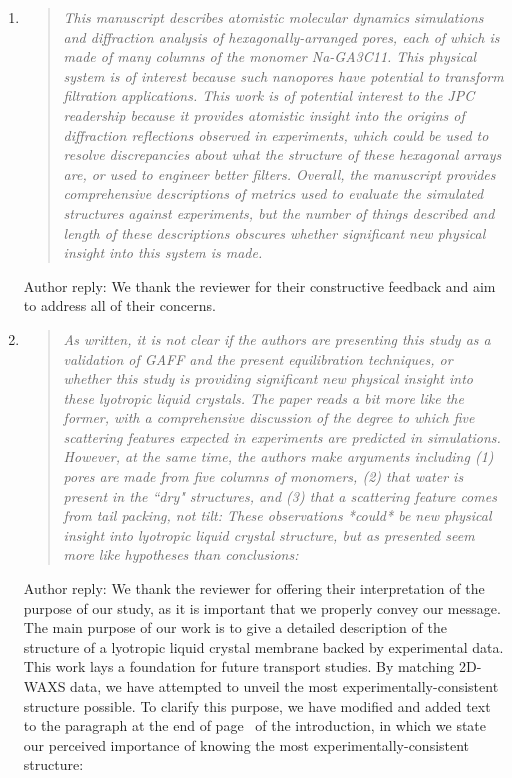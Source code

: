 \documentclass{article}
\begin{document}
\begin{enumerate}
	
    \item \begin{quote} \textit{This manuscript describes atomistic molecular
	    dynamics simulations and diffraction analysis of hexagonally-arranged pores,
	    each of which is made of many columns of the monomer Na-GA3C11. This physical
	    system is of interest because such nanopores have potential to transform
	    filtration applications. This work is of potential interest to the JPC
	    readership because it provides atomistic insight into the origins of
	    diffraction reflections observed in experiments, which could be used to resolve
	    discrepancies about what the structure of these hexagonal arrays are, or used
	    to engineer better filters. Overall, the manuscript provides comprehensive
	    descriptions of metrics used to evaluate the simulated structures against
	    experiments, but the number of things described and length of these
	    descriptions obscures whether significant new physical insight into this system
	    is made.} 
    \end{quote}
	
    Author reply: We thank the reviewer for their constructive feedback and aim to 
    address all of their concerns. 
	
    \item \begin{quote}
    \textit{As written, it is not clear if the authors are presenting this
	    study as a validation of GAFF and the present equilibration techniques, or
	    whether this study is providing significant new physical insight into these
	    lyotropic liquid crystals. The paper reads a bit more like the former, with a
	    comprehensive discussion of the degree to which five scattering features
	    expected in experiments are predicted in simulations. However, at the same
	    time, the authors make arguments including (1) pores are made from five columns
	    of monomers, (2) that water is present in the ``dry" structures, and (3) that a
	    scattering feature comes from tail packing, not tilt: These observations
	    *could* be new physical insight into lyotropic liquid crystal structure, but as
	    presented seem more like hypotheses than conclusions:}

    \end{quote}

    Author reply: We thank the reviewer for offering their interpretation of
    the purpose of our study, as it is important that we properly convey our
    message. The main purpose of our work is to give a detailed description of the
    structure of a lyotropic liquid crystal membrane backed by experimental data.
    This work lays a foundation for future transport studies. By matching 2D-WAXS
    data, we have attempted to unveil the most experimentally-consistent structure
    possible. To clarify this purpose, we have modified and added text to the
    paragraph at the end of page~\pageref{M-rework:purpose} of the introduction, 
    in which we state our perceived importance of knowing the most 
    experimentally-consistent structure:


\end{enumerate}
\end{document}
